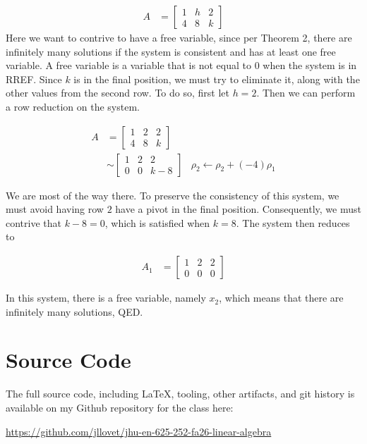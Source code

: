 \documentclass[10pt,letterpaper,final]{report}
\begin{document}
\begin{enumerate}
        \begin{align*}
          A & =
          \left[\begin{array}{rr|r}
              1 & h & 2 \\
              4 & 8 & k
            \end{array}\right]
        \end{align*}
        Here we want to contrive to have a free variable, since per Theorem 2, there are infinitely many solutions if the system is consistent and has at least one free variable. A free variable is a variable that is not equal to $0$ when the system is in RREF. Since $k$ is in the final position, we must try to eliminate it, along with the other values from the second row. To do so, first let $h = 2$. Then we can perform a row reduction on the system.

        \begin{align*}
          A & =
          \left[\begin{array}{rr|r}
              1 & 2 & 2 \\
              4 & 8 & k
            \end{array}\right]
          \\[6pt]
            & \sim
          \left[\begin{array}{rr|r}
              1 & 2 & 2   \\
              0 & 0 & k-8
            \end{array}\right]
            & \rho_2 \leftarrow \rho_2 + (-4)\rho_1
        \end{align*}

        We are most of the way there. To preserve the consistency of this system, we must avoid having row $2$ have a pivot in the final position. Consequently, we must contrive that $k-8 = 0$, which is satisfied when $k=8$. The system then reduces to

        \begin{align*}
          A_1 & =
          \left[\begin{array}{rr|r}
              1 & 2 & 2 \\
              0 & 0 & 0
            \end{array}\right]
        \end{align*}

        In this system, there is a free variable, namely $x_2$, which means that there are infinitely many solutions, QED.
\end{enumerate}

\pagebreak


\section*{Source Code}
The full source code, including LaTeX, tooling, other artifacts, and git history is available on my Github repository for the class here:
\begin{center}
  \url{https://github.com/jllovet/jhu-en-625-252-fa26-linear-algebra}
\end{center}

\printbibliography
\end{document}

